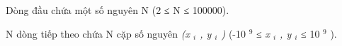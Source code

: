 Dòng đầu chứa một số nguyên       N      (2 ≤       N      ≤ 100000).  

       N      dòng tiếp theo chứa       N      cặp số nguyên   \textit{    (x    $_     i    $    , y    $_     i    $    )   }   (-10   $^    9   $   ≤   \textit{    x    $_     i    $    , y    $_     i    $}   ≤ 10   $^    9   $   ).